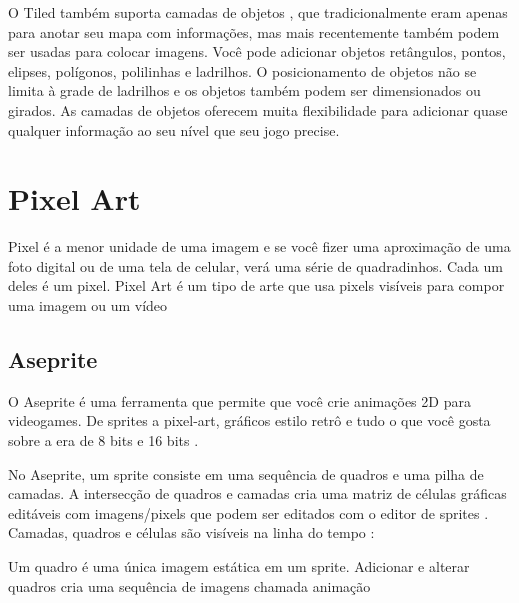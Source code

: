 O Tiled também suporta camadas de objetos , que tradicionalmente eram apenas para anotar seu mapa com informações, mas mais recentemente também podem ser usadas para colocar imagens. Você pode adicionar objetos retângulos, pontos, elipses, polígonos, polilinhas e ladrilhos. O posicionamento de objetos não se limita à grade de ladrilhos e os objetos também podem ser dimensionados ou girados. As camadas de objetos oferecem muita flexibilidade para adicionar quase qualquer informação ao seu nível que seu jogo precise.

\section{Pixel Art}
Pixel é a menor unidade de uma imagem e se você fizer uma aproximação de uma foto digital ou de uma tela de celular, verá uma série de quadradinhos. Cada um deles é um pixel.
Pixel Art é um tipo de arte que usa pixels visíveis para compor uma imagem ou um vídeo
\subsection{Aseprite}
O Aseprite é uma ferramenta que permite que você crie animações 2D para videogames. De sprites a pixel-art, gráficos estilo retrô e tudo o que você gosta sobre a era de 8 bits e 16 bits . \cite{Aseprite}

No Aseprite, um sprite consiste em uma sequência de quadros e uma pilha de camadas. A intersecção de quadros e camadas cria uma matriz de células gráficas editáveis com imagens/pixels que podem ser editados com o editor de sprites . Camadas, quadros e células são visíveis na linha do tempo :

Um quadro é uma única imagem estática em um sprite. Adicionar e alterar quadros cria uma sequência de imagens chamada animação